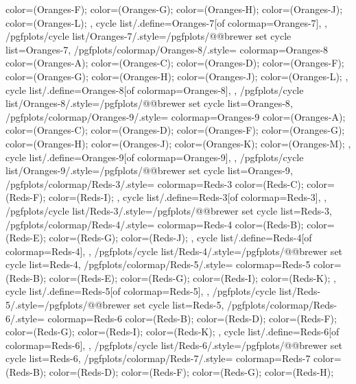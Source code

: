 {{{      color=(Oranges-F);
      color=(Oranges-G);
      color=(Oranges-H);
      color=(Oranges-J);
      color=(Oranges-L);
    },
    cycle list/.define={Oranges-7}{[of colormap=Oranges-7]},
  },
  /pgfplots/cycle list/Oranges-7/.style={/pgfplots/@@brewer set cycle list={Oranges-7}},
  /pgfplots/colormap/Oranges-8/.style={
    colormap={Oranges-8}{
      color=(Oranges-A);
      color=(Oranges-C);
      color=(Oranges-D);
      color=(Oranges-F);
      color=(Oranges-G);
      color=(Oranges-H);
      color=(Oranges-J);
      color=(Oranges-L);
    },
    cycle list/.define={Oranges-8}{[of colormap=Oranges-8]},
  },
  /pgfplots/cycle list/Oranges-8/.style={/pgfplots/@@brewer set cycle list={Oranges-8}},
  /pgfplots/colormap/Oranges-9/.style={
    colormap={Oranges-9}{
      color=(Oranges-A);
      color=(Oranges-C);
      color=(Oranges-D);
      color=(Oranges-F);
      color=(Oranges-G);
      color=(Oranges-H);
      color=(Oranges-J);
      color=(Oranges-K);
      color=(Oranges-M);
    },
    cycle list/.define={Oranges-9}{[of colormap=Oranges-9]},
  },
  /pgfplots/cycle list/Oranges-9/.style={/pgfplots/@@brewer set cycle list={Oranges-9}},
  /pgfplots/colormap/Reds-3/.style={
    colormap={Reds-3}{
      color=(Reds-C);
      color=(Reds-F);
      color=(Reds-I);
    },
    cycle list/.define={Reds-3}{[of colormap=Reds-3]},
  },
  /pgfplots/cycle list/Reds-3/.style={/pgfplots/@@brewer set cycle list={Reds-3}},
  /pgfplots/colormap/Reds-4/.style={
    colormap={Reds-4}{
      color=(Reds-B);
      color=(Reds-E);
      color=(Reds-G);
      color=(Reds-J);
    },
    cycle list/.define={Reds-4}{[of colormap=Reds-4]},
  },
  /pgfplots/cycle list/Reds-4/.style={/pgfplots/@@brewer set cycle list={Reds-4}},
  /pgfplots/colormap/Reds-5/.style={
    colormap={Reds-5}{
      color=(Reds-B);
      color=(Reds-E);
      color=(Reds-G);
      color=(Reds-I);
      color=(Reds-K);
    },
    cycle list/.define={Reds-5}{[of colormap=Reds-5]},
  },
  /pgfplots/cycle list/Reds-5/.style={/pgfplots/@@brewer set cycle list={Reds-5}},
  /pgfplots/colormap/Reds-6/.style={
    colormap={Reds-6}{
      color=(Reds-B);
      color=(Reds-D);
      color=(Reds-F);
      color=(Reds-G);
      color=(Reds-I);
      color=(Reds-K);
    },
    cycle list/.define={Reds-6}{[of colormap=Reds-6]},
  },
  /pgfplots/cycle list/Reds-6/.style={/pgfplots/@@brewer set cycle list={Reds-6}},
  /pgfplots/colormap/Reds-7/.style={
    colormap={Reds-7}{
      color=(Reds-B);
      color=(Reds-D);
      color=(Reds-F);
      color=(Reds-G);
      color=(Reds-H);
}}}
